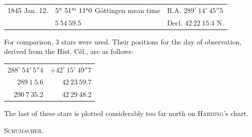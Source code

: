 \begin{center}
\setlength{\tabcolsep}{3pt}
\begin{tabular}{lll}
1845 Jan. 12. & $5^{\rm u}\ 51^{\rm m}\ 11^{\rm s}0$ Göttingen mean time & R.A. $289^\circ\ 14'\ 45''5$ \\
 & $5\ 54\ 59.5$ & Decl. $42\ 22\ 15.4$ N. \\
\end{tabular}
\end{center}

For comparison, 3 stars were used. Their positions for the day of observation, derived from the Hist. Cél., are as follows:

\begin{center}
\begin{tabular}{rr}
$288^\circ\ 54'\ 5''4$ & $+42^\circ\ 15'\ 49''7$ \\
$289\ 1\ 5.6$ & $42\ 23\ 59.7$ \\
$290\ 7\ 35.2$ & $42\ 29\ 48.2$ \\
\end{tabular}
\end{center}

The last of these stars is plotted considerably too far north on \textsc{Harding}’s chart.
\begin{flushright}\textsc{Schumacher}.\end{flushright}
